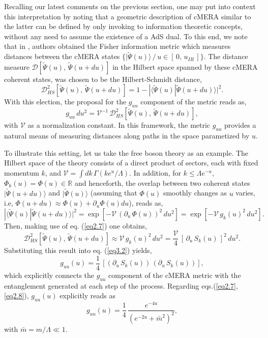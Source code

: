 \documentclass[preprint,aps]{revtex4}
\def\beq{\begin{equation}}
\def\eeq{\end{equation}}
\begin{document}
Recalling our latest comments on the previous section, one may put into context this interpretation by noting that a geometric description of cMERA similar to the latter can be defined by only invoking to information theoretic concepts, without any need to assume the existence of a AdS dual. To this end, we note  that in \cite{taka1}, authors obtained the Fisher information metric which measures distances between the cMERA states $\lbrace |\widetilde{\Psi}(u)\rangle\,/ \, u \in \left[\, 0,\, u_{IR}\, \right]  \rbrace $. The distance measure $\mathcal{D}\left[\widetilde{\Psi}(u),\, \widetilde{\Psi}(u+du) \right] $ in the Hilbert space spanned by these cMERA coherent states, was chosen to be the Hilbert-Schmidt distance,
\beq
\label{eq3.1}
\mathcal{D}^{2}_{HS}\left[\widetilde{\Psi}(u),\, \widetilde{\Psi}(u+du) \right]= 1-|\langle \widetilde{\Psi}(u)|\widetilde{\Psi}(u+du)\rangle|^2 .
\eeq
With this election, the proposal for the $g_{uu}$ component of the metric reads as,
\beq
\label{eq3.2}
g_{uu}\, du^2= \mathcal{V}^{-1}\, \mathcal{D}^{2}_{HS}\left[\widetilde{\Psi}(u),\, \widetilde{\Psi}(u+du) \right],
\eeq
with $\mathcal{V}$ as a normalization constant. In this framework, the metric $g_{uu}$ provides a natural means of measuring distances along paths in the space parametized by $u$.

To illustrate this setting, let us take the free boson theory as an example. The Hilbert space of the theory consists of a direct product of sectors, each with fixed momentum $k$, and $\mathcal{V}=\int dk\, \Gamma(ke^{u}/\Lambda)$. 
In addition, for $k\leq \Lambda e^{-u}$, $\Phi_k(u)=\Phi(u) \in \mathbb{R}$ and henceforth, the overlap between two coherent states $|\widetilde{\Psi}(u + du)\rangle$ and $|\widetilde{\Psi}(u)\rangle$ (assuming that $\Phi(u)$ smoothly changes as $u$ varies, i.e, $\Phi(u+du) \approx \Phi(u) + \partial_u \Phi(u) du$), reads as,
\beq
\label{eq3.4}
|\langle \widetilde{\Psi}(u)|\widetilde{\Psi}(u +du)\rangle|^2 = \exp\left[ -\mathcal{V}\, \left(\partial_u\, \Phi(u)\right)^2\, du^2\right] = \exp \left[ -\mathcal{V}\, g_k(u)^2\, du^2\right].
\eeq
Then, making use of eq. (\ref{eq2.7}) one obtains, 
\beq
\label{eq3.4x}
\mathcal{D}^2_{HS}\left[\widetilde{\Psi}(u),\, \widetilde{\Psi}(u+du) \right]  \approx \mathcal{V}\, g_k(u)^2 \, du^2 = \frac{\mathcal{V}}{4}\, \left[\, \partial_u\, S_k(u)\, \right]^2\, du^2.
\eeq
Substituting this result into eq. (\ref{eq3.2}) yields,
\beq
\label{eq3.5}
g_{uu}(u) = \frac{1}{4}\, \left[ (\partial_u\, S_k(u))\, (\partial_u\, S_k(u)) \right],
\eeq 
which explicitly connects the $g_{uu}$ component of the cMERA metric with the entanglement generated at each step of the process. Regarding eqs.(\ref{eq2.7},\, \ref{eq2.8}), $g_{uu}(u)$ explicitly reads as
\beq
\label{eq3.5i}
g_{uu}(u)=\frac{1}{4}\, \frac{e^{-4u}}{\left(e^{-2u} + \bar{m}^2 \right)^2 },
\eeq
with $\bar{m} = m/\Lambda \ll 1$. 
\end{document}
